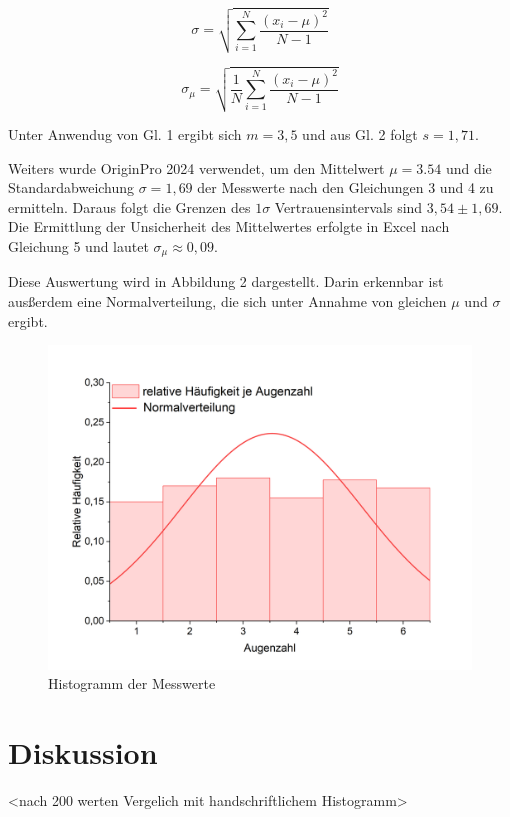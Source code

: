 \documentclass[a4paper,12pt]{article}
\begin{document}
\begin{equation}
    \sigma = \sqrt{\sum_{i=1}^{N} \frac{(x_i - \mu)^2}{N-1}}
\end{equation}

\begin{equation}
    \sigma_\mu = \sqrt{\frac{1}{N} \sum_{i=1}^{N} \frac{(x_i - \mu)^2}{N - 1}}
\end{equation}

\vspace{0,5cm}

Unter Anwendug von Gl. 1 ergibt sich $m=3,5$ und aus Gl. 2 folgt $s=1,71$.

Weiters wurde OriginPro 2024 verwendet, um den Mittelwert $\mu=3.54$ und die Standardabweichung $\sigma = 1,69$ der Messwerte
nach den Gleichungen 3 und 4 zu ermitteln.
Daraus folgt die Grenzen des $1\sigma$ Vertrauensintervals sind $3,54\pm1,69$.
Die Ermittlung der Unsicherheit des Mittelwertes erfolgte in Excel nach Gleichung 5 und lautet $\sigma_\mu\approx0,09$.

Diese Auswertung wird in Abbildung 2 dargestellt. Darin erkennbar ist ausßerdem eine Normalverteilung, die sich unter Annahme von gleichen $\mu$ und $\sigma$ ergibt.

\begin{figure}[H]
    \centering
    \includegraphics[width=\textwidth]{bilder/Histogramm.png}
    \caption{Histogramm der Messwerte}
\end{figure}

\section{Diskussion}

<nach 200 werten Vergelich mit handschriftlichem Histogramm>
\end{document}
